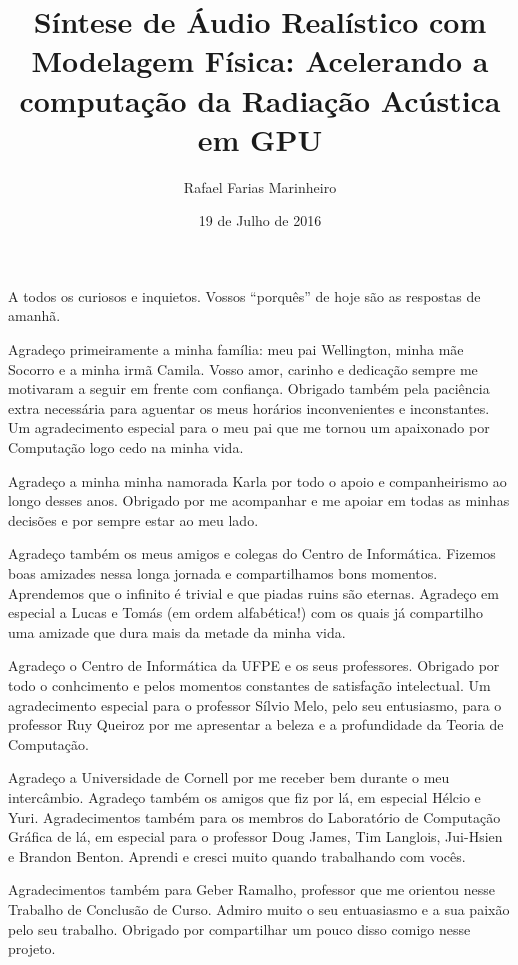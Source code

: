 \documentclass[oneside, bsc]{ufpethesis}
\institute{Centro de Informática}
\title{Síntese de Áudio Realístico com Modelagem Física: Acelerando a computação da Radiação Acústica em GPU}
\date{19 de Julho de 2016}
\author{Rafael Farias Marinheiro}
\begin{document}
\frontmatter

\frontpage

\presentationpage

\begin{dedicatory}
A todos os curiosos e inquietos. Vossos ``porquês'' de hoje são as respostas de amanhã.
\end{dedicatory}

\acknowledgements
Agradeço primeiramente a minha família: meu pai Wellington, minha mãe Socorro e a minha irmã Camila. Vosso amor, carinho e dedicação sempre me motivaram a seguir em frente com confiança. Obrigado também pela paciência extra necessária para aguentar os meus horários inconvenientes e inconstantes. Um agradecimento especial para o meu pai que me tornou um apaixonado por Computação logo cedo na minha vida.

Agradeço a minha minha namorada Karla por todo o apoio e companheirismo ao longo desses anos. Obrigado por me acompanhar e me apoiar em todas as minhas decisões e por sempre estar ao meu lado.

Agradeço também os meus amigos e colegas do Centro de Informática. Fizemos boas amizades nessa longa jornada e compartilhamos bons momentos. Aprendemos que o infinito é trivial e que piadas ruins são eternas. Agradeço em especial a Lucas e Tomás (em ordem alfabética!) com os quais já compartilho uma amizade que dura mais da metade da minha vida.

Agradeço o Centro de Informática da UFPE e os seus professores. Obrigado por todo o conhcimento e pelos momentos constantes de satisfação intelectual. Um agradecimento especial para o professor Sílvio Melo, pelo seu entusiasmo, para o professor Ruy Queiroz por me apresentar a beleza e a profundidade da Teoria de Computação.

Agradeço a Universidade de Cornell por me receber bem durante o meu intercâmbio. Agradeço também os amigos que fiz por lá, em especial Hélcio e Yuri. Agradecimentos também para os membros do Laboratório de Computação Gráfica de lá, em especial para o professor Doug James, Tim Langlois, Jui-Hsien e Brandon Benton. Aprendi e cresci muito quando trabalhando com vocês.

Agradecimentos também para Geber Ramalho, professor que me orientou nesse Trabalho de Conclusão de Curso. Admiro muito o seu entuasiasmo e a sua paixão pelo seu trabalho. Obrigado por compartilhar um pouco disso comigo nesse projeto.
\end{document}
